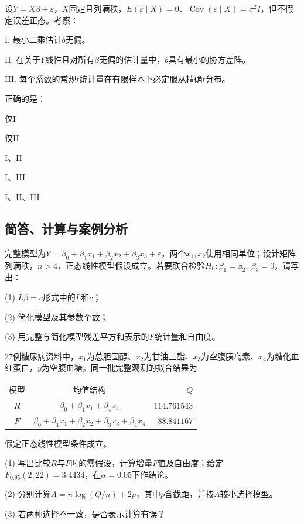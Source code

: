 \par\noindent\begin{minipage}{\linewidth}
设$Y=X\beta+\varepsilon$，$X$固定且列满秩，$E(\varepsilon\mid X)=0$、$\operatorname{Cov}(\varepsilon\mid X)=\sigma^2I$，但不假定误差正态。考察：\par I. 最小二乘估计$b$无偏。\par II. 在关于$Y$线性且对所有$\beta$无偏的估计量中，$b$具有最小的协方差阵。\par III. 每个系数的常规$t$统计量在有限样本下必定服从精确$t$分布。\par 正确的是：
\begin{choices}
\item 仅I
\item 仅II
\item I、II
\item I、III
\item I、II、III
\end{choices}
\end{minipage}\par\medskip

\subsection{简答、计算与案例分析}

完整模型为$Y=\beta_0+\beta_1x_1+\beta_2x_2+\beta_3x_3+\varepsilon$，两个$x_1,x_2$使用相同单位；设计矩阵列满秩，$n>4$，正态线性模型假设成立。若要联合检验$H_0:\beta_1=\beta_2,\ \beta_3=0$，请写出：\par (1) $L\beta=c$形式中的$L$和$c$；\par (2) 简化模型及其参数个数；\par (3) 用完整与简化模型残差平方和表示的$F$统计量和自由度。

27例糖尿病资料中，$x_1$为总胆固醇、$x_2$为甘油三酯、$x_3$为空腹胰岛素、$x_4$为糖化血红蛋白，$y$为空腹血糖。同一批完整观测的拟合结果为\begin{center}\small\setlength{\tabcolsep}{5pt}
\begin{tabular}{ccr}
\toprule
$\text{模型}$ & $\text{均值结构}$ & $Q$ \\
\midrule
$R$ & $\beta_0+\beta_1x_1+\beta_4x_4$ & $114.761543$ \\
$F$ & $\beta_0+\beta_1x_1+\beta_2x_2+\beta_3x_3+\beta_4x_4$ & $88.841167$ \\
\bottomrule
\end{tabular}
\end{center}假定正态线性模型条件成立。\par (1) 写出比较$R$与$F$时的零假设，计算增量$F$值及自由度；给定$F_{0.95}(2,22)=3.4434$，在$\alpha=0.05$下作结论。\par (2) 分别计算$A=n\log(Q/n)+2p$，其中$p$含截距，并按$A$较小选择模型。\par (3) 若两种选择不一致，是否表示计算有误？


